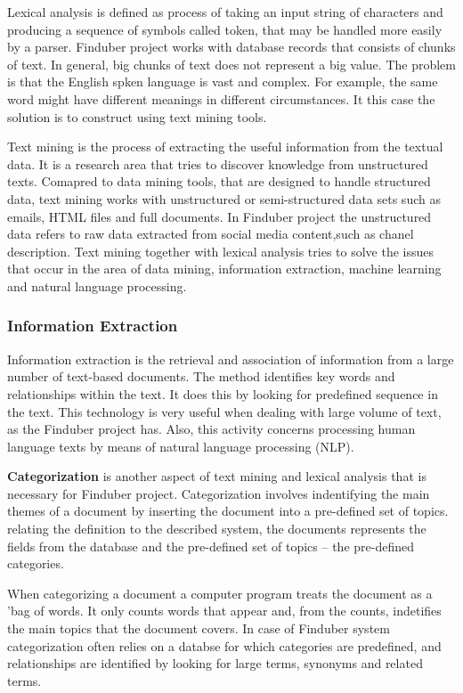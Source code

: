 Lexical analysis is defined as process of taking an input string of characters and producing a sequence of symbols called token, that may be handled more easily by a parser. Finduber project works with database records that consists of chunks of text. In general, big chunks of text does not represent a big value. The problem is that the English spken language is vast and complex. For example, the same word might have different meanings in different circumstances. It this case the solution is to construct using text mining tools. 

Text mining is the process of extracting the useful information from the textual data. It is a research area that tries to discover knowledge from unstructured texts. Comapred to data mining tools, that are designed to handle structured data, text mining works with unstructured or semi-structured data sets such as emails, HTML files and full documents.\cite{survey} In Finduber project the unstructured data refers to raw data extracted from social media content,such as chanel description. Text mining together with lexical analysis tries to solve the issues that occur in the area of data mining, information extraction, machine learning and natural language processing. 

\subsubsection{Information Extraction}

Information extraction is the retrieval and association of information from a large number of text-based documents. The method identifies key words and relationships within the text. It does this by looking for predefined sequence in the text. This technology is very useful when dealing with large volume of text, as the Finduber project has. Also, this activity concerns processing human language texts by means of natural language processing (NLP). 

\textbf{Categorization} is another aspect of text mining and lexical analysis that is necessary for Finduber project. Categorization involves indentifying the main themes of a document by inserting the document into a pre-defined set of topics. relating the definition to the described system, the documents represents the fields from the database and the pre-defined set of topics -- the pre-defined categories. 

When categorizing a document a computer program treats the document as a 'bag of words. It only counts words that appear and, from the counts, indetifies the main topics that the document covers. In case of Finduber system categorization often relies on a databse for which categories are predefined, and relationships are identified by looking for large terms, synonyms and related terms.

